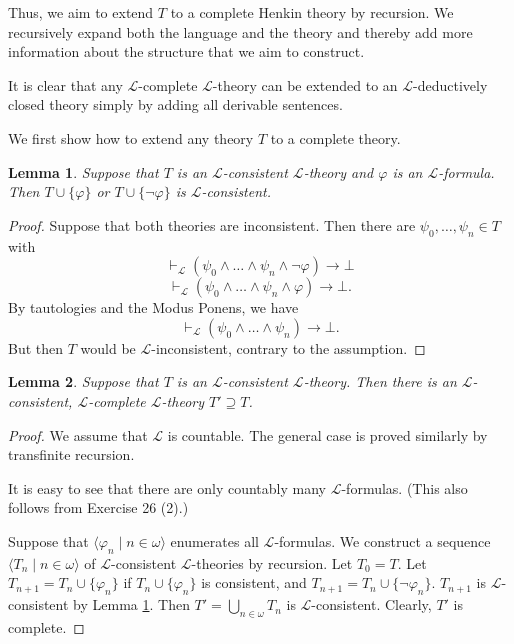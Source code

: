 \documentclass[a4paper, 11pt]{amsart}
\newtheorem{lemma}[lemma]{Lemma}
\theoremstyle{remark}
\newcommand{\Th}{\mathrm{Th}}
\newcommand{\cL}{\mathcal L}
\newcommand{\cM}{\mathcal M}
\begin{document}
Thus, we aim to extend $T$ to a complete Henkin theory by recursion. 
We recursively expand both the language and the theory and thereby add more information about the structure that we aim to construct. 

It is clear that any $\cL$-complete $\cL$-theory can be extended to an $\cL$-deductively closed theory simply by adding all derivable sentences. 

We first show how to extend any theory $T$ to a complete theory. 


\begin{lemma} 
\label{extend consistent theory by a formula} 
Suppose that $T$ is an $\cL$-consistent $\cL$-theory and $\varphi$ is an $\cL$-formula. 
Then $T\cup \{\varphi\}$ or $T\cup \{\neg \varphi\}$ is $\cL$-consistent. 
\end{lemma} 
\begin{proof} 
Suppose that both theories are inconsistent. 
Then there are $\psi_0, \dots, \psi_n\in T$ with 
$$ \vdash_\cL (\psi_0 \wedge \dots \wedge \psi_n \wedge \neg\varphi) \rightarrow \bot  $$ 
$$ \vdash_\cL (\psi_0 \wedge \dots \wedge \psi_n\wedge \varphi) \rightarrow \bot. $$ 
By tautologies and the Modus Ponens, we have 
$$ \vdash_\cL (\psi_0 \wedge \dots \wedge \psi_n) \rightarrow \bot.$$ 
But then $T$ would be $\cL$-inconsistent, contrary to the assumption. 
\end{proof} 


\begin{lemma} 
\label{extend theory to complete theory} 
Suppose that $T$ is an $\cL$-consistent $\cL$-theory. 
Then there is an $\cL$-consistent, $\cL$-complete $\cL$-theory $T'\supseteq T$. 
\end{lemma} 
\begin{proof} 
We assume that $\cL$ is countable. The general case is proved similarly by transfinite recursion. 

It is easy to see that there are only countably many $\cL$-formulas. 
(This also follows from Exercise 26 (2).) 

Suppose that $\langle \varphi_n \mid n\in\omega\rangle$ enumerates all $\cL$-formulas. 
We construct a sequence $\langle T_n \mid n\in\omega\rangle$ of $\cL$-consistent $\cL$-theories by recursion. 
Let $T_0=T$. 
Let $T_{n+1}=T_n\cup \{\varphi_n\}$ if $T_n\cup\{\varphi_n\}$ is consistent, and $T_{n+1}=T_n\cup\{\neg \varphi_n\}$. 
$T_{n+1}$ is $\cL$-consistent by Lemma \ref{extend consistent theory by a formula}. 
Then $T'=\bigcup_{n\in\omega} T_n$ is $\cL$-consistent. 
Clearly, $T'$ is complete. 
\end{proof} 
\end{document}
